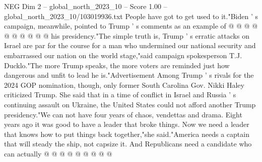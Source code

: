\begin{textsample}{NEG Dim 2 – global\_north\_2023\_10 – Score 1.00 – global\_north\_2023\_10/103019936.txt}
People have got to get used to it."Biden ' s campaign, meanwhile, pointed to Trump ' s comments as an example of @ @ @ @ @ @ @ @ @ @ his presidency."The simple truth is, Trump ' s erratic attacks on Israel are par for the course for a man who undermined our national security and embarrassed our nation on the world stage,"said campaign spokesperson T.J.
Ducklo."The more Trump speaks, the more voters are reminded just how dangerous and unfit to lead he is."Advertisement Among Trump ' s rivals for the 2024 GOP nomination, though, only former South Carolina Gov.
Nikki Haley criticized Trump.
She said that in a time of conflict in Israel and Russia ' s continuing assault on Ukraine, the United States could not afford another Trump presidency."We can not have four years of chaos, vendettas and drama.
Eight years ago it was good to have a leader that broke things.
Now we need a leader that knows how to put things back together,"she said."America needs a captain that will steady the ship, not capsize it.
And Republicans need a candidate who can actually @ @ @ @ @ @ @ @ @

\end{textsample}
